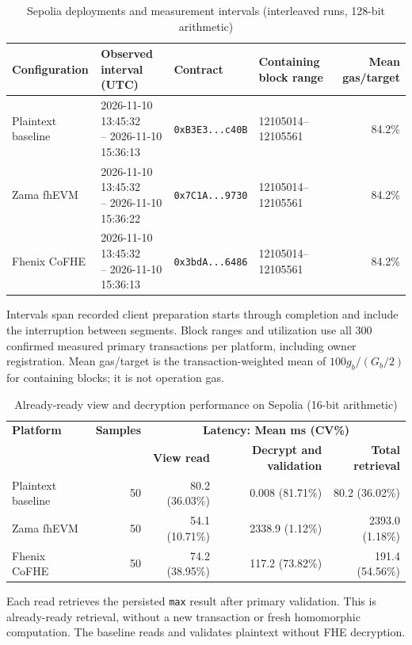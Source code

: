\begin{table}[!t]
\caption{Sepolia deployments and measurement intervals (interleaved runs, 128-bit arithmetic)}
\label{tab:sepolia-experiment-deployments-128}
\centering
\footnotesize
\setlength{\tabcolsep}{4pt}
\begin{tabular}{|l|l|l|l|r|}
\hline
\textbf{Configuration} &
\textbf{Observed interval (UTC)} &
\textbf{Contract} &
\textbf{Containing block range} &
\textbf{Mean gas/target} \\
\hline
Plaintext baseline &
\shortstack[l]{2026-11-10 13:45:32 \\ -- 2026-11-10 15:36:13} &
\texttt{0xB3E3...c40B} &
12105014--12105561 &
84.2\% \\
\hline
Zama fhEVM &
\shortstack[l]{2026-11-10 13:45:32 \\ -- 2026-11-10 15:36:22} &
\texttt{0x7C1A...9730} &
12105014--12105561 &
84.2\% \\
\hline
Fhenix CoFHE &
\shortstack[l]{2026-11-10 13:45:32 \\ -- 2026-11-10 15:36:13} &
\texttt{0x3bdA...6486} &
12105014--12105561 &
84.2\% \\
\hline
\end{tabular}
\vspace{2pt}
\parbox{\textwidth}{\scriptsize Intervals span recorded client preparation starts through completion and include the interruption between segments. Block ranges and utilization use all 300 confirmed measured primary transactions per platform, including owner registration. Mean gas/target is the transaction-weighted mean of $100g_b/(G_b/2)$ for containing blocks; it is not operation gas.}
\end{table}

\begin{table}[!t]
\caption{Already-ready view and decryption performance on Sepolia (16-bit arithmetic)}
\label{tab:ready-view-decrypt-sepolia-16}
\centering
\scriptsize
\setlength{\tabcolsep}{4pt}
\begin{tabular}{|l|r|rrr|}
\hline
\textbf{Platform} & \textbf{Samples} & \multicolumn{3}{c|}{\textbf{Latency: Mean ms (CV\%)}} \\
\cline{3-5}
& & \textbf{View read} & \textbf{Decrypt and validation} & \textbf{Total retrieval} \\
\hline
Plaintext baseline & 50 & 80.2 (36.03\%) & 0.008 (81.71\%) & 80.2 (36.02\%) \\
Zama fhEVM & 50 & 54.1 (10.71\%) & 2338.9 (1.12\%) & 2393.0 (1.18\%) \\
Fhenix CoFHE & 50 & 74.2 (38.95\%) & 117.2 (73.82\%) & 191.4 (54.56\%) \\
\hline
\end{tabular}
\vspace{2pt}
\parbox{\textwidth}{\scriptsize Each read retrieves the persisted \texttt{max} result after primary validation. This is already-ready retrieval, without a new transaction or fresh homomorphic computation. The baseline reads and validates plaintext without FHE decryption.}
\end{table}

